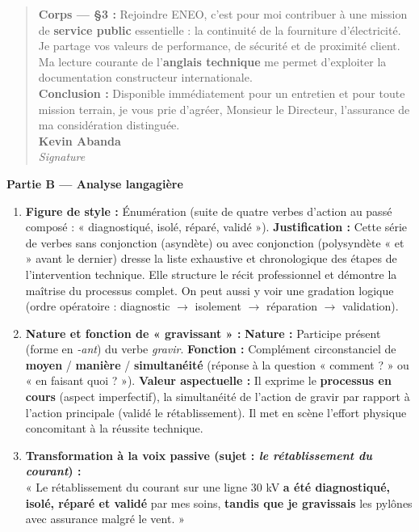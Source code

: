 \documentclass[11pt]{article}
\newcommand{\cle}[1]{{\popxbold\color{popdark}#1}}
\begin{document}
\begin{corrige}
\begin{quote}
\textbf{Corps — §3 :} Rejoindre ENEO, c'est pour moi contribuer à une mission de \textbf{service public} essentielle : la continuité de la fourniture d'électricité. Je partage vos valeurs de performance, de sécurité et de proximité client. Ma lecture courante de l'\textbf{anglais technique} me permet d'exploiter la documentation constructeur internationale. \\[0.5em]
\textbf{Conclusion :} Disponible immédiatement pour un entretien et pour toute mission terrain, je vous prie d'agréer, Monsieur le Directeur, l'assurance de ma considération distinguée. \\[1em]
\textbf{Kevin Abanda} \\
\textit{Signature}
\end{quote}

\textbf{Partie B — Analyse langagière}
\begin{enumerate}
    \item \textbf{Figure de style :} \cle{Énumération} (suite de quatre verbes d'action au passé composé : « diagnostiqué, isolé, réparé, validé »). \textbf{Justification :} Cette série de verbes sans conjonction (asyndète) ou avec conjonction (polysyndète « et » avant le dernier) dresse la liste exhaustive et chronologique des étapes de l'intervention technique. Elle structure le récit professionnel et démontre la maîtrise du processus complet. On peut aussi y voir une \cle{gradation} logique (ordre opératoire : diagnostic $\rightarrow$ isolement $\rightarrow$ réparation $\rightarrow$ validation).
    \item \textbf{Nature et fonction de « gravissant » :} \textbf{Nature :} Participe présent (forme en \emph{-ant}) du verbe \emph{gravir}. \textbf{Fonction :} Complément circonstanciel de \textbf{moyen} / \textbf{manière} / \textbf{simultanéité} (réponse à la question « comment ? » ou « en faisant quoi ? »). \textbf{Valeur aspectuelle :} Il exprime le \textbf{processus en cours} (aspect imperfectif), la simultanéité de l'action de gravir par rapport à l'action principale (validé le rétablissement). Il met en scène l'effort physique concomitant à la réussite technique.
    \item \textbf{Transformation à la voix passive (sujet : \emph{le rétablissement du courant}) :} \\
    « Le rétablissement du courant sur une ligne 30 kV \textbf{a été diagnostiqué, isolé, réparé et validé} par mes soins, \textbf{tandis que je gravissais} les pylônes avec assurance malgré le vent. » \\

\end{enumerate}
\end{corrige}
\end{document}
